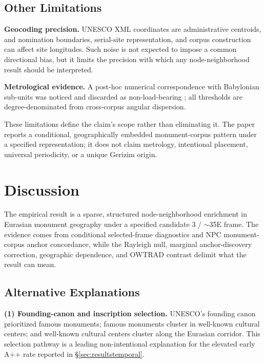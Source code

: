 \subsection{Other Limitations}

\textbf{Geocoding precision.}
UNESCO XML coordinates are administrative centroids, and nomination
boundaries, serial-site representation, and corpus construction can
affect site longitudes. Such noise is not expected to impose a common
directional bias, but it limits the precision with which any
node-neighborhood result should be interpreted.

\textbf{Metrological evidence.}
A post-hoc numerical correspondence with Babylonian sub-units was
noticed and discarded as non-load-bearing
\citep{hunger2019mul,robson2008mathematics,powell1987metrological};
all thresholds are degree-denominated from cross-corpus angular
dispersion.

These limitations define the claim's scope rather than eliminating it.
The paper reports a conditional, geographically embedded
monument-corpus pattern under a specified representation; it does not
claim metrology, intentional placement, universal periodicity, or a
unique Gerizim origin.

\section{Discussion}
\label{sec:discussion}

The empirical result is a sparse, structured node-neighborhood
enrichment in Eurasian monument geography under a specified candidate
3\textdegree{} / $\sim$35\textdegree{}E frame. The evidence comes from
conditional selected-frame diagnostics and NPC monument-corpus anchor
concordance, while the Rayleigh null, marginal anchor-discovery
correction, geographic dependence, and OWTRAD contrast delimit what
the result can mean.

\subsection{Alternative Explanations}
\label{sec:alt_explanations}

\textbf{(1) Founding-canon and inscription selection.}
UNESCO's founding canon prioritized famous monuments; famous monuments
cluster in well-known cultural centers; and well-known cultural
centers cluster along the Eurasian corridor. This selection pathway is
a leading non-intentional explanation for the elevated early A++ rate
reported in \S\ref{sec:resultstemporal}.

